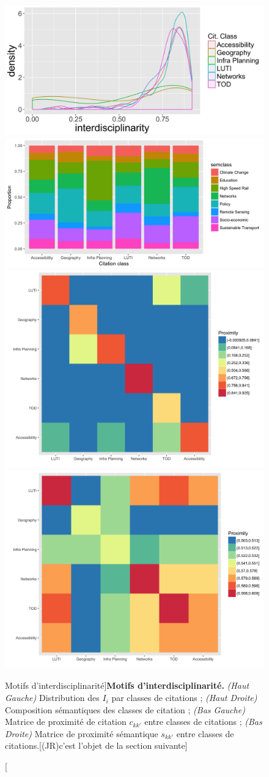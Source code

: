\begin{figure}
\includegraphics[width=0.49\linewidth]{Figures/QuantEpistemo/interdisciplinarities}
\includegraphics[width=0.49\linewidth]{Figures/QuantEpistemo/compo_proportion}\\
\includegraphics[width=0.49\linewidth]{Figures/QuantEpistemo/citation_proximities}
\includegraphics[width=0.49\linewidth]{Figures/QuantEpistemo/semantic_proximities}
\caption[][Motifs d'interdisciplinarité]{\label{fig:quantepistemo:interdisc}}{\textbf{Motifs d'interdisciplinarité.} \textit{(Haut Gauche)} Distribution des $I_i$ par classes de citations ; \textit{(Haut Droite)} Composition sémantiques des classes de citation ; \textit{(Bas Gauche)} Matrice de proximité de citation $c_{kk'}$ entre classes de citations ; \textit{(Bas Droite)} Matrice de proximité sémantique $s_{kk'}$ entre classes de citations.\label{fig:quantepistemo:interdisc}[(JR)c'est l'objet de la section suivante]}
\end{figure}



